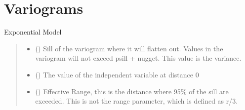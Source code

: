 \documentclass[letterpaper,10pt,english]{sphinxmanual}
\begin{document}
\section{Variograms}
\label{\detokenize{covariance:variograms}}

\begin{fulllineitems}
\label{\detokenize{covariance:glomar_gridding.variogram.ExponentialVariogram}}
\pysigstartsignatures
\pysiglinewithargsret
{}
{\sphinxparamcomma {}\sphinxparamcomma {}\sphinxparamcomma {}}
{}
\pysigstopsignatures
\sphinxAtStartPar
Exponential Model
\begin{quote}\begin{description}
\begin{itemize}
\item {}
\sphinxAtStartPar
{} (\sphinxstyleliteralemphasis{\sphinxupquote{ | }}) \textendash{} Sill of the variogram where it will flatten out. Values in the variogram
will not exceed psill + nugget. This value is the variance.

\item {}
\sphinxAtStartPar
{} (\sphinxstyleliteralemphasis{\sphinxupquote{ | }}) \textendash{} The value of the independent variable at distance 0

\item {}
\sphinxAtStartPar
{} (\sphinxstyleliteralemphasis{\sphinxupquote{ | }}\sphinxstyleliteralemphasis{\sphinxupquote{ | }}) \textendash{} Effective Range, this is the distance where 95\% of the sill are
exceeded. This is not the range parameter, which is defined as r/3.


\end{itemize}
\end{description}
\end{quote}
\end{fulllineitems}
\end{document}
